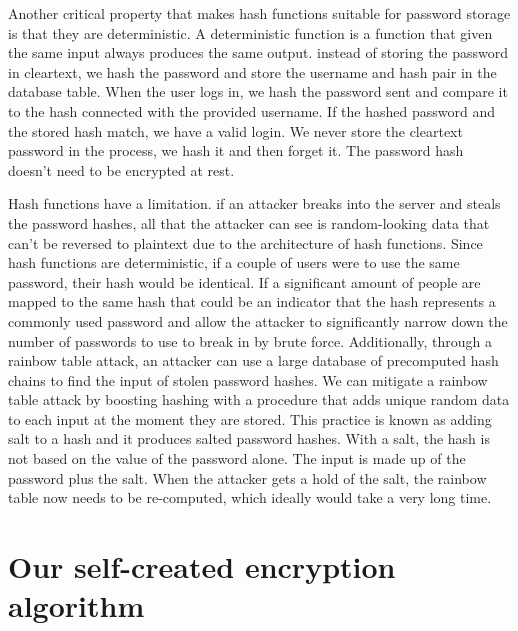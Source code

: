\documentclass[]{article}
\begin{document}
Another critical property that makes hash functions suitable for password storage is that they are deterministic. 
A deterministic function is a function that given the same input always produces the same output. instead of storing 
the password in cleartext, we hash the password and store the username and hash pair in the database table. When 
the user logs in, we hash the password sent and compare it to the hash connected with the provided username. If the 
hashed password and the stored hash match, we have a valid login. We never store the 
cleartext password in the process, we hash it and then forget it. The password hash doesn't need to be encrypted at 
rest. 

Hash functions have a limitation. if an attacker breaks into the server and steals the password hashes, all that the 
attacker can see is random-looking data that can't be reversed to plaintext due to the architecture of hash functions. 
Since hash functions are deterministic, if a couple of users 
were to use the same password, their hash would be identical. If a significant amount of people are mapped to the same 
hash that could be an indicator that the hash represents a commonly used password and allow the attacker to significantly 
narrow down the number of passwords to use to break in by brute force. Additionally, through a rainbow table attack, 
an attacker can use a large database of precomputed hash chains to find the input of stolen password hashes. We can 
mitigate a rainbow table attack by boosting hashing with a procedure that adds unique random data to each input at the 
moment they are stored. This practice is known as adding salt to a hash and it produces salted password hashes. 
With a salt, the hash is not based on the value of the password alone. The input is made up of the password plus the salt. 
When the attacker gets a hold of the salt, the rainbow table now needs to be re-computed, which ideally would take a very 
long time. \cite{auth0}


\section{Our self-created encryption algorithm}
\end{document}
